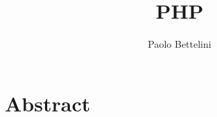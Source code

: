 \documentclass{article}
\title{PHP}
\author{Paolo Bettelini}
\date{}
\begin{document}
\maketitle
\tableofcontents
\pagebreak

\section{Abstract}

\pagebreak
\end{document}
